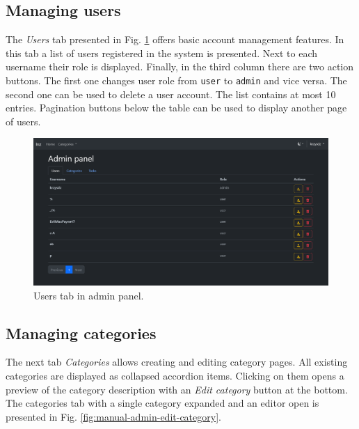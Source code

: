 \subsection{Managing users}

The \textit{Users} tab presented in Fig. \ref{fig:manual-admin-users} offers basic account management features. In this tab a list of users registered in the system is presented. Next to each username their role is displayed. Finally, in the third column there are two action buttons. The first one changes user role from \texttt{user} to \texttt{admin} and vice versa. The second one can be used to delete a user account. The list contains at most 10 entries. Pagination buttons below the table can be used to display another page of users.

\begin{figure}
    \centering
    \includegraphics[width=\textwidth]{img/manual-admin-users.png}
    \caption{Users tab in admin panel.}
    \label{fig:manual-admin-users}
\end{figure}

\subsection{Managing categories}
\label{ssec:managing-categories}

The next tab \textit{Categories} allows creating and editing category pages. All existing categories are displayed as collapsed accordion items. Clicking on them opens a preview of the category description with an \textit{Edit category} button at the bottom. The categories tab with a single category expanded and an editor open is presented in Fig. \ref{fig:manual-admin-edit-category}.

